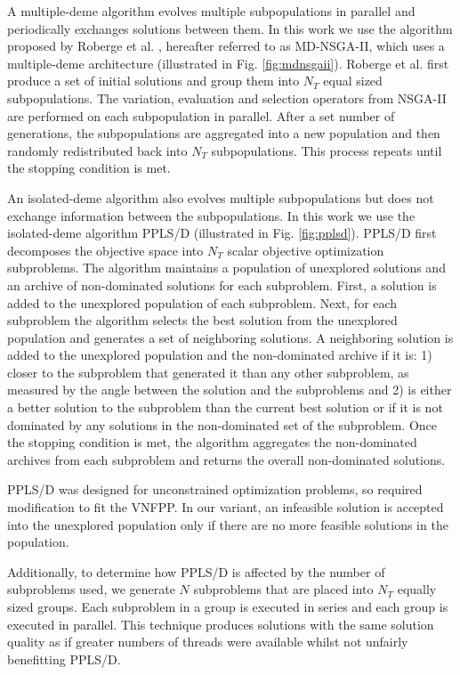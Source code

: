 A multiple-deme algorithm evolves multiple subpopulations in parallel and periodically exchanges solutions between them. In this work we use the algorithm proposed by Roberge et al. \cite{RobergeTL13}, hereafter referred to as MD-NSGA-II, which uses a multiple-deme architecture (illustrated in Fig. \ref{fig:mdnsgaii}). Roberge et al. first produce a set of initial solutions and group them into $N_T$ equal sized subpopulations. The variation, evaluation and selection operators from NSGA-II are performed on each subpopulation in parallel. After a set number of generations, the subpopulations are aggregated into a new population and then randomly redistributed back into $N_T$ subpopulations. This process repeats until the stopping condition is met.

An isolated-deme algorithm also evolves multiple subpopulations but does not exchange information between the subpopulations. In this work we use the isolated-deme algorithm PPLS/D \cite{ShiZS20} (illustrated in Fig. \ref{fig:pplsd}). PPLS/D first decomposes the objective space into $N_T$ scalar objective optimization subproblems. The algorithm maintains a population of unexplored solutions and an archive of non-dominated solutions for each subproblem. First, a solution is added to the unexplored population of each subproblem. Next, for each subproblem the algorithm selects the best solution from the unexplored population and generates a set of neighboring solutions. A neighboring solution is added to the unexplored population and the non-dominated archive if it is: 1) closer to the subproblem that generated it than any other subproblem, as measured by the angle between the solution and the subproblems and 2) is either a better solution to the subproblem than the current best solution or if it is not dominated by any solutions in the non-dominated set of the subproblem. Once the stopping condition is met, the algorithm aggregates the non-dominated archives from each subproblem and returns the overall non-dominated solutions.

PPLS/D was designed for unconstrained optimization problems, so required modification to fit the VNFPP. In our variant, an infeasible solution is accepted into the unexplored population only if there are no more feasible solutions in the population. 

Additionally, to determine how PPLS/D is affected by the number of subproblems used, we generate $N$ subproblems that are placed into $N_T$ equally sized groups. Each subproblem in a group is executed in series and each group is executed in parallel. This technique produces solutions with the same solution quality as if greater numbers of threads were available whilst not unfairly benefitting PPLS/D.

